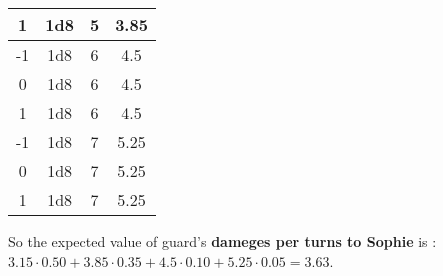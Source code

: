 \begin{table}[H]
\begin{tabular}{|c|c|c|c|}
    1 & 1d8 & 5 & 3.85 \\ \hline
    -1 & 1d8 & 6 & 4.5 \\ \hline
    0 & 1d8 & 6 & 4.5 \\ \hline
    1 & 1d8 & 6 & 4.5 \\ \hline
    -1 & 1d8 & 7 & 5.25 \\ \hline
    0 & 1d8 & 7 & 5.25 \\ \hline
    1 & 1d8 & 7 & 5.25 \\ \hline
  \end{tabular}
\end{table}
So the expected value of guard's \textbf{dameges per turns to Sophie} is :\\
$3.15 \cdot 0.50 + 3.85 \cdot 0.35 + 4.5 \cdot 0.10 + 5.25 \cdot 0.05 = 3.63$.\\

